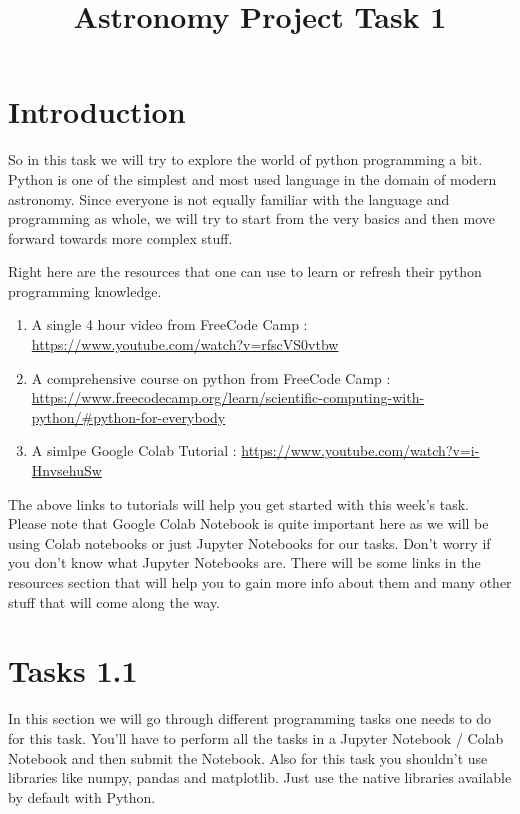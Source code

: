 \documentclass[a4paper]{article}
\title{Astronomy Project Task 1}
\begin{document}
\maketitle

\section{Introduction}
So in this task we will try to explore the world of python programming a bit. Python is one of the simplest and most used language 
in the domain of modern astronomy. Since everyone is not equally familiar with the language and programming as whole, we will try to start from the very basics 
and then move forward towards more complex stuff. 

Right here are the resources that one can use to learn or refresh their python programming knowledge. 
\begin{enumerate}
    \item A single 4 hour video from FreeCode Camp : \url{ https://www.youtube.com/watch?v=rfscVS0vtbw }
    \item A comprehensive course on python from FreeCode Camp : \url{https://www.freecodecamp.org/learn/scientific-computing-with-python/#python-for-everybody}
    \item A simlpe Google Colab Tutorial : \url{https://www.youtube.com/watch?v=i-HnvsehuSw}
\end{enumerate}



The above links to tutorials will help you get started with this week's task. 
\\
Please note that Google Colab Notebook is quite important here as we will be using Colab notebooks or just Jupyter Notebooks for our tasks. 
Don't worry if you don't know what Jupyter Notebooks are. There will be some links in the resources section that will help you to gain more info about them and many other stuff that will come along the way. 

\section{Tasks 1.1}
In this section we will go through different programming tasks one needs to do for this task. 
You'll have to perform all the tasks in a Jupyter Notebook / Colab Notebook and then submit the Notebook. Also for this task you shouldn't use libraries like numpy, pandas and matplotlib. 
Just use the native libraries available by default with Python.
\end{document}
